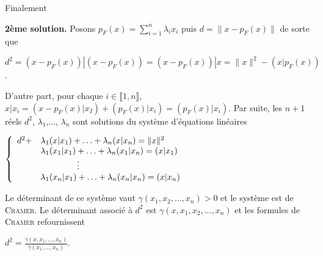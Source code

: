 {\begin{enumerate}
{Finalement 

\begin{center}
\end{center}

\textbf{2ème solution.} Posons $p_F(x) =\sum_{i=1}^{n}\lambda_ix_i$ puis  $d =\|x-p_F(x)\|$ de sorte que

\begin{center}
$d^2 =(x-p_F(x))|(x-p_F(x)) =(x-p_F(x))|x =\|x\|^2 -(x|p_F(x))$.
\end{center}

D'autre part, pour chaque $i\in\llbracket1,n\rrbracket$, $x|x_i=(x-p_F(x)|x_I)+(p_F(x)|x_i)=(p_F(x)|x_i)$. Par suite, les $n+1$ réels $d^2$, $\lambda_1$,..., $\lambda_n$ sont solutions du système d'équations linéaires
 
\begin{center}
$\left\{
\begin{array}{ll}
d^2+&\lambda_1(x|x_1)+\ldots+\lambda_n(x|x_n)=\|x\|^2\\
 &\lambda_1(x_1|x_1)+\ldots+\lambda_n(x_1|x_n)=(x|x_1)\\
 &\rule{1,5cm}{0mm}\vdots\\
 &\lambda_1(x_n|x_1)+\ldots+\lambda_n(x_n|x_n)=(x|x_n)
\end{array}
\right.$
\end{center}

Le déterminant de ce système vaut $\gamma(x_1,x_2,...,x_n)>0$ et le système est de \textsc{Cramer}. Le déterminant associé à $d^2$ est $\gamma(x,x_1,x_2,...,x_n)$ et les formules de \textsc{Cramer} refournissent

\begin{center}
$d^2=\frac{\gamma(x,x_1,\ldots,x_n)}{\gamma(x_1,\ldots,x_n)}$.
\end{center}}
\end{enumerate}
}
